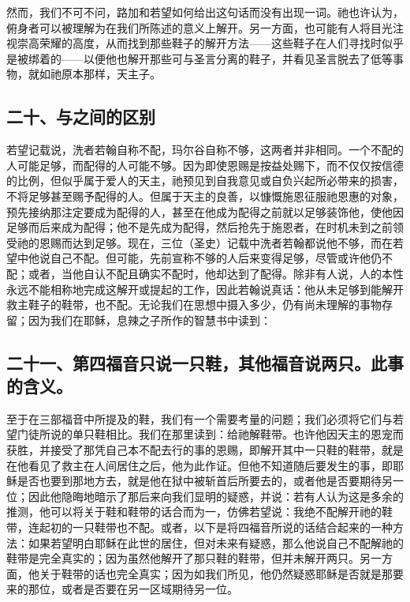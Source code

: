 然而，我们不可不问，路加和若望如何给出这句话而没有出现一词。祂也许认为，俯身者可以被理解为在我们所陈述的意义上解开。另一方面，也可能有人将目光注视崇高荣耀的高度，从而找到那些鞋子的解开方法——这些鞋子在人们寻找时似乎是被绑着的——以便他也解开那些可与圣言分离的鞋子，并看见圣言脱去了低等事物，就如祂原本那样，天主子。\par


\subsection{二十、与之间的区别}

若望记载说，洗者若翰自称不配，玛尔谷自称不够，这两者并非相同。一个不配的人可能足够，而配得的人可能不够。因为即使恩赐是按益处赐下，而不仅仅按信德的比例，但似乎属于爱人的天主，祂预见到自我意见或自负兴起所必带来的损害，不将足够甚至赐予配得的人。但属于天主的良善，以慷慨施恩征服祂恩惠的对象，预先接纳那注定要成为配得的人，甚至在他成为配得之前就以足够装饰他，使他因足够而后来成为配得；他不是先成为配得，然后抢先于施恩者，在时机未到之前领受祂的恩赐而达到足够。现在，三位（圣史）记载中洗者若翰都说他不够，而在若望中他说自己不配。但可能，先前宣称不够的人后来变得足够，尽管或许他仍不配；或者，当他自认不配且确实不配时，他却达到了配得。除非有人说，人的本性永远不能相称地完成这解开或提起的工作，因此若翰说真话：他从未足够到能解开救主鞋子的鞋带，也不配。无论我们在思想中摄入多少，仍有尚未理解的事物存留；因为我们在耶稣，息辣之子所作的智慧书中读到： \par


\subsection{二十一、第四福音只说一只鞋，其他福音说两只。此事的含义。}

至于在三部福音中所提及的鞋，我们有一个需要考量的问题；我们必须将它们与若望门徒所说的单只鞋相比。我们在那里读到：给祂解鞋带。也许他因天主的恩宠而获胜，并接受了那凭自己本不配去行的事的恩赐，即解开其中一只鞋的鞋带，就是在他看见了救主在人间居住之后，他为此作证。但他不知道随后要发生的事，即耶稣是否也要到那地方去，就是他在狱中被斩首后所要去的，或者他是否要期待另一位；因此他隐晦地暗示了那后来向我们显明的疑惑，并说：若有人认为这是多余的推测，他可以将关于鞋和鞋带的话合而为一，仿佛若望说：我绝不配解开祂的鞋带，连起初的一只鞋带也不配。或者，以下是将四福音所说的话结合起来的一种方法：如果若望明白耶稣在此世的居住，但对未来有疑惑，那么他说自己不配解祂的鞋带是完全真实的；因为虽然他解开了那只鞋的鞋带，但并未解开两只。另一方面，他关于鞋带的话也完全真实；因为如我们所见，他仍然疑惑耶稣是否就是那要来的那位，或者是否要在另一区域期待另一位。\par

